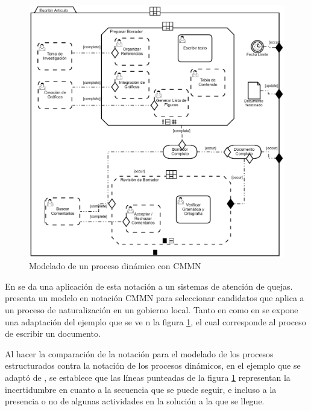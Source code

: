\begin{figure}[h]
  \centering
    \includegraphics[scale=0.25]{ModeloCMM.png}
  \caption[Modelado de un proceso dinámico]{Modelado de un proceso dinámico con CMMN}
  \label{EjCMMN}
\end{figure}

En \citet{marin2016introduction} se da una aplicación de esta notación a un sistemas de atención de quejas. \citet{breitenmoser2015case} presenta un modelo en notación CMMN para seleccionar candidatos que aplica a un proceso de naturalización en un gobierno local. Tanto en \citet{auer2014business}  como en \citet{omg2011business} se expone una adaptación del ejemplo que se ve n la figura \ref{EjCMMN}, el cual corresponde al proceso de escribir un documento.


Al hacer la comparación de la notación para el modelado de los procesos estructurados contra la notación de los procesos dinámicos, en el ejemplo que se adaptó de \citet{Cmmn11}, se establece que las líneas punteadas de la figura \ref{EjCMMN} representan la incertidumbre en cuanto a la secuencia que se puede seguir, e incluso a la presencia o no de algunas actividades en la solución a la que se llegue.

